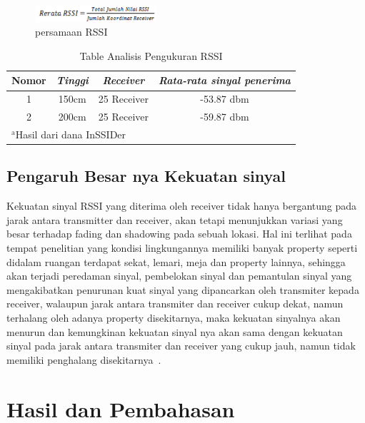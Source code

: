 \documentclass[conference]{IEEEtran}
\begin{document}
\begin{figure}[h]
    \centering
    \includegraphics[width=0.4\textwidth]{persamaan-rssi.png}
    \caption{persamaan RSSI}
\end{figure}

\begin{table}[htbp]
    \caption{Table Analisis Pengukuran RSSI}
    \begin{center}
    \begin{tabular}{|c|c|c|c|}
        \hline
    \textbf{Nomor} & \textbf{\textit{Tinggi}}& \textbf{\textit{Receiver}}& \textbf{\textit{Rata-rata sinyal penerima}} \\
    \hline
    1 & 150cm& 25 Receiver & -53.87 dbm  \\
    \hline
    2 & 200cm& 25 Receiver & -59.87 dbm  \\
    \hline
    \multicolumn{4}{l}{$^{\mathrm{a}}$Hasil dari dana InSSIDer}
    \end{tabular}
    \label{tab1}
    \end{center}
    \end{table}

\subsection{Pengaruh Besar nya Kekuatan sinyal}
Kekuatan sinyal RSSI yang diterima oleh
receiver tidak hanya bergantung pada jarak
antara transmitter dan receiver, akan tetapi
menunjukkan variasi yang besar terhadap fading
dan shadowing pada sebuah lokasi. Hal ini
terlihat pada tempat penelitian yang kondisi
lingkungannya memiliki banyak property seperti
didalam ruangan terdapat sekat, lemari, meja dan
property lainnya, sehingga akan terjadi peredaman sinyal, pembelokan sinyal dan pemantulan
sinyal yang mengakibatkan penurunan kuat
sinyal yang dipancarkan oleh transmiter kepada
receiver, walaupun jarak antara transmiter dan
receiver cukup dekat, namun terhalang oleh
adanya property disekitarnya, maka kekuatan
sinyalnya akan menurun dan kemungkinan
kekuatan sinyal nya akan sama dengan kekuatan
sinyal pada jarak antara transmiter dan receiver
yang cukup jauh, namun tidak memiliki
penghalang disekitarnya~. \cite{puspitasari2014analisis}




\section{Hasil dan Pembahasan}
\end{document}
